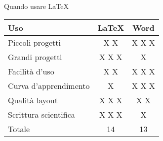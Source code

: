 \begin{frame}{Quando usare \LaTeX}
	\begin{table}[H]
		\centering
		\begin{tabular}{lcc}
			\hline
			\textbf{Uso}          & \textbf{\LaTeX{}} & \textbf{Word} \\
			\hline
			Piccoli progetti      &  X X  & X X X \\
			Grandi progetti       & X X X &   X   \\
			Facilità d'uso        &  X X  & X X X \\
			Curva d'apprendimento &   X   & X X X \\
			Qualità layout        & X X X &  X X  \\
			Scrittura scientifica & X X X &   X   \\
			\hline
			Totale                &   14  &  13   \\
			\hline
		\end{tabular}
	\end{table}
\end{frame}